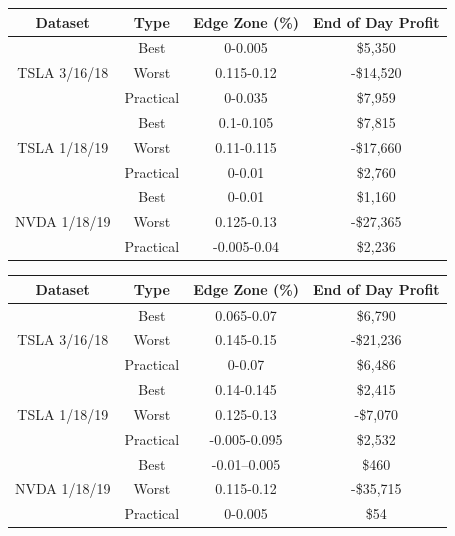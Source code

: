 \documentclass[12pt, a4paper, notitlepage]{article}
\numberwithin{equation}{subsection}
\numberwithin{figure}{subsection}
\numberwithin{table}{subsection}
\begin{document}
\begin{center}
    \captionsetup{hypcap=false}
    \label{tab:SmileBestAndWorstEdgeZones}
    \begin{tabular}{ |c|c|c|c| }
        \hline \rowcolor{LightGreen}
        \textbf{Dataset} & \textbf{Type}  & \textbf{Edge Zone (\%)} & \textbf{End of Day Profit} \\ \hline
        \multirow{3}{*}{TSLA 3/16/18}
        &   Best       &   0-0.005     &   \$5,350     \\
        &   Worst      &   0.115-0.12  &   -\$14,520   \\
        &   Practical  &   0-0.035     &   \$7,959     \\ \hline
        \multirow{3}{*}{TSLA 1/18/19}
        &   Best       &   0.1-0.105   &   \$7,815     \\ 
        &   Worst      &   0.11-0.115  &   -\$17,660   \\ 
        &   Practical  &   0-0.01      &   \$2,760     \\ \hline
        \multirow{3}{*}{NVDA 1/18/19}
        &   Best       &   0-0.01      &   \$1,160     \\ 
        &   Worst      &   0.125-0.13  &   -\$27,365   \\ 
        &   Practical  &   -0.005-0.04 &   \$2,236     \\ \hline
    \end{tabular}
\end{center}

\begin{center}
    \captionsetup{hypcap=false}
    \label{tab:TwistBestAndWorstEdgeZones}
    \begin{tabular}{ |c|c|c|c| }
        \hline \rowcolor{LightGreen}
        \textbf{Dataset} & \textbf{Type}  & \textbf{Edge Zone (\%)} & \textbf{End of Day Profit} \\ \hline
        \multirow{3}{*}{TSLA 3/16/18}
        &   Best       &  0.065-0.07   &   \$6,790      \\
        &   Worst      &  0.145-0.15   &   -\$21,236    \\
        &   Practical  &  0-0.07       &   \$6,486      \\ \hline
        \multirow{3}{*}{TSLA 1/18/19}
        &   Best       &  0.14-0.145   &   \$2,415      \\
        &   Worst      &  0.125-0.13   &   -\$7,070     \\
        &   Practical  &  -0.005-0.095 &   \$2,532      \\ \hline
        \multirow{3}{*}{NVDA 1/18/19}
        &   Best       &  -0.01--0.005 &   \$460        \\
        &   Worst      &  0.115-0.12   &   -\$35,715    \\
        &   Practical  &  0-0.005      &   \$54         \\ \hline
    \end{tabular}
\end{center}
\end{document}
